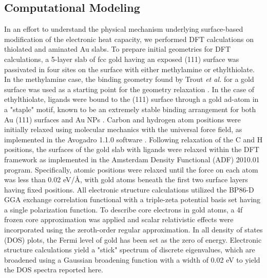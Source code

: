 \subsection{Computational Modeling}
In an effort to understand the physical mechanism underlying surface-based modification of the electronic heat capacity, we performed DFT calculations on thiolated and aminated Au slabs.  To prepare initial geometries for DFT calculations, a 5-layer slab of fcc gold having an exposed (111) surface was passivated in four sites on the surface with either methylamine or ethylthiolate. In the methylamine case, the binding geometry found by Trout \emph{et al.} for a gold surface was used as a starting point for the geometry relaxation \cite{pong2005first}. In the case of ethylthiolate, ligands were bound to the (111) surface through a gold ad-atom in a "staple" motif, known to be an extremely stable binding arrangement for both Au (111) surfaces and Au NPs \cite{voznyy2009c,pensa2012chemistry}. Carbon and hydrogen atom positions were initially relaxed using molecular mechanics with the universal force field, as implemented in the Avogadro 1.1.0 software \cite{hanwell2012avogadro}. Following relaxation of the C and H positions, the surfaces of the gold slab with ligands were relaxed within the DFT framework as implemented in the Amsterdam Density Functional (ADF) 2010.01 program. Specifically, atomic positions were relaxed until the force on each atom was less than 0.02 eV/\r{A}, with gold atoms beneath the first two surface layers having fixed positions. All electronic structure calculations utilized the BP86-D GGA exchange correlation functional with a triple-zeta potential basis set having a single polarization function.  To describe core electrons in gold atoms, a 4f frozen core approximation was applied and scalar relativistic effects were incorporated using the zeroth-order regular approximation. In all density of states (DOS) plots, the Fermi level of gold has been set as the zero of energy.  Electronic structure calculations yield a "stick" spectrum of discrete eigenvalues, which are broadened using a Gaussian broadening function with a width of 0.02 eV to yield the DOS spectra reported here. \par

